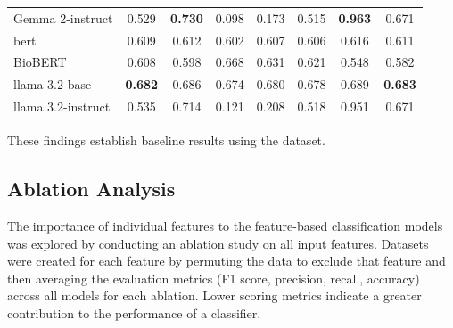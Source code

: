 \documentclass[pdflatex,sn-mathphys-num]{sn-jnl}
\begin{document}
\begin{table}[htbp]
\begin{tabular}{l*{7}{c}}
		Gemma 2-instruct          & 0.529                 & \textbf{ 0.730}                   & 0.098                         & 0.173          & 0.515          & \textbf{0.963} & 0.671          \\
		\gls*{bert}               & 0.609                 & 0.612                             & 0.602                         & 0.607          & 0.606          & 0.616          & 0.611          \\
		BioBERT                   & 0.608                 & 0.598                             & 0.668                         & 0.631          & 0.621          & 0.548          & 0.582          \\
		\gls*{llama} 3.2-base     & \textbf{0.682}        & 0.686                             & 0.674                         & 0.680          & 0.678          & 0.689          & \textbf{0.683} \\
		\gls*{llama} 3.2-instruct & 0.535                 & 0.714                             & 0.121                         & 0.208          & 0.518          & 0.951          & 0.671          \\
		\bottomrule
	\end{tabular}
\end{table}

These findings establish baseline results using the dataset.

\subsection{Ablation Analysis}

The importance of individual features to the feature-based classification models was explored by conducting an ablation study on all input features. Datasets were created for each feature by permuting the data to exclude that feature and then averaging the evaluation metrics (F1 score, precision, recall, accuracy) across all models for each ablation. Lower scoring metrics indicate a greater contribution to the performance of a classifier.
\end{document}
